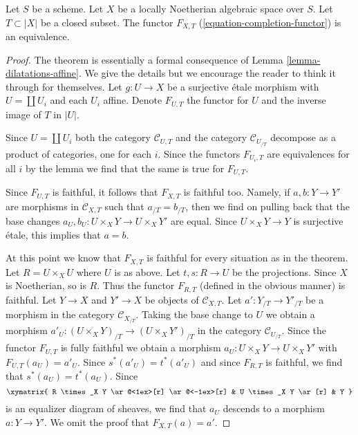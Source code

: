 \begin{theorem}
\label{theorem-dilatations-general}
Let $S$ be a scheme. Let $X$ be a locally Noetherian algebraic space over $S$.
Let $T \subset |X|$ be a closed subset. The functor $F_{X, T}$
(\ref{equation-completion-functor}) is an equivalence.
\end{theorem}

\begin{proof}
The theorem is essentially a formal consequence of
Lemma \ref{lemma-dilatations-affine}. We give the details but
we encourage the reader to think it through for themselves.
Let $g : U \to X$ be a surjective \'etale morphism with $U = \coprod U_i$
and each $U_i$ affine. Denote $F_{U, T}$ the functor for $U$ and the
inverse image of $T$ in $|U|$.

\medskip\noindent
Since $U = \coprod U_i$ both the category $\mathcal{C}_{U, T}$ and
the category $\mathcal{C}_{U_{/T}}$ decompose as a product of categories,
one for each $i$. Since the functors $F_{U_i, T}$ are equivalences
for all $i$ by the lemma we find that the same is true for $F_{U, T}$.

\medskip\noindent
Since $F_{U, T}$ is faithful, it follows that $F_{X, T}$
is faithful too. Namely, if $a, b : Y \to Y'$ are morphisms
in $\mathcal{C}_{X, T}$ such that $a_{/T} = b_{/T}$, then we find
on pulling back that the base changes
$a_U, b_U : U \times_X Y \to U \times_X Y'$ are equal.
Since $U \times_X Y \to Y$ is surjective \'etale, this implies that $a = b$.

\medskip\noindent
At this point we know that $F_{X, T}$ is faithful for every situation
as in the theorem. Let $R = U \times_X U$ where $U$ is as above.
Let $t, s : R \to U$ be the projections.
Since $X$ is Noetherian, so is $R$. Thus the functor $F_{R, T}$
(defined in the obvious manner) is
faithful. Let $Y \to X$ and $Y' \to X$ be objects of $\mathcal{C}_{X, T}$.
Let $a' : Y_{/T} \to Y'_{/T}$ be a morphism in the category
$\mathcal{C}_{X_{/T}}$. Taking the base change to $U$ we obtain a
morphism $a'_U : (U \times_X Y)_{/T} \to (U \times_X Y')_{/T}$
in the category $\mathcal{C}_{U_{/T}}$. Since the functor $F_{U, T}$
is fully faithful we obtain a morphism $a_U : U \times_X Y \to U \times_X Y'$
with $F_{U, T}(a_U) = a'_U$. Since $s^*(a'_U) = t^*(a'_U)$ and since
$F_{R, T}$ is faithful, we find that $s^*(a_U) = t^*(a_U)$.
Since
$$
\xymatrix{
R \times_X Y \ar@<1ex>[r] \ar@<-1ex>[r] &
U \times_X Y \ar[r] & Y
}
$$
is an equalizer diagram of sheaves, we find that $a_U$ descends to
a morphism $a : Y \to Y'$. We omit the proof that $F_{X, T}(a) = a'$.


\end{proof}
